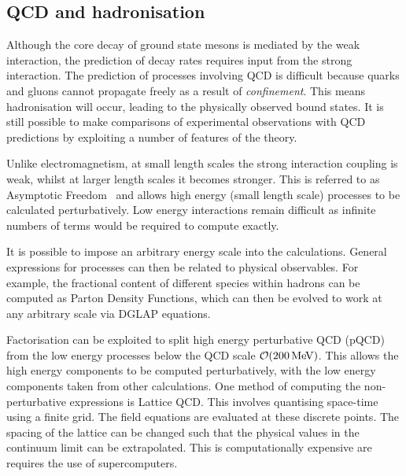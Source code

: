 \subsection{QCD and hadronisation}
\label{sec:theory_QCD}
Although the core decay of ground state \Bp mesons is mediated by the weak interaction, the prediction of decay rates requires input from the strong interaction.  
The prediction of processes involving QCD is difficult because quarks and gluons cannot propagate freely as a result of \emph{confinement}. This means hadronisation will occur, leading to the physically observed bound states. It is still possible to make comparisons of experimental observations with QCD predictions by exploiting a number of features of the theory. 

Unlike electromagnetism, at small length scales the strong interaction coupling is weak, whilst at larger length scales it becomes stronger. This is referred to as Asymptotic Freedom~\cite{PhysRevLett.30.1343,PhysRevLett.30.1346} and allows high energy (small length scale) processes to be calculated perturbatively. Low energy interactions remain difficult as infinite numbers of terms would be required to compute exactly.  

It is possible to impose an arbitrary energy scale into the calculations. General expressions for processes can then be related to physical observables. 
For example, the fractional content of different species within hadrons can be computed as Parton Density Functions, which can then be evolved to work at any arbitrary scale via DGLAP equations. 

Factorisation can be exploited to split high energy perturbative QCD (pQCD) from the low energy processes below the QCD scale $\mathcal{O}(200\mathrm{\,Me\kern -0.1em V})$. This allows the high energy components to be computed perturbatively, with the low energy components taken from other calculations. One method of computing the non-perturbative expressions is Lattice QCD. This involves quantising space-time using a finite grid. The field equations are evaluated at these discrete points. The spacing of the lattice can be changed such that the physical values in the continuum limit can be extrapolated. This is computationally expensive are requires the use of supercomputers. 


